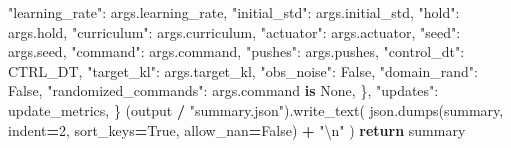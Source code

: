 \documentclass[
  american,
  11pt,
  letterpaper,
]{article}
\newenvironment{Shaded}{\begin{snugshade}}{\end{snugshade}}
\newcommand{\CharTok}[1]{\textcolor[rgb]{0.31,0.60,0.02}{#1}}
\newcommand{\ControlFlowTok}[1]{\textcolor[rgb]{0.13,0.29,0.53}{\textbf{#1}}}
\newcommand{\DecValTok}[1]{\textcolor[rgb]{0.00,0.00,0.81}{#1}}
\newcommand{\KeywordTok}[1]{\textcolor[rgb]{0.13,0.29,0.53}{\textbf{#1}}}
\newcommand{\NormalTok}[1]{#1}
\newcommand{\OperatorTok}[1]{\textcolor[rgb]{0.81,0.36,0.00}{\textbf{#1}}}
\newcommand{\StringTok}[1]{\textcolor[rgb]{0.31,0.60,0.02}{#1}}
\newcommand{\VariableTok}[1]{\textcolor[rgb]{0.00,0.00,0.00}{#1}}
\renewenvironment{Shaded}{\par\smallskip}{\par\smallskip}
\begin{document}
\begin{Shaded}
\begin{Highlighting}[]
            \StringTok{"learning\_rate"}\NormalTok{: args.learning\_rate,}
            \StringTok{"initial\_std"}\NormalTok{: args.initial\_std,}
            \StringTok{"hold"}\NormalTok{: args.hold,}
            \StringTok{"curriculum"}\NormalTok{: args.curriculum,}
            \StringTok{"actuator"}\NormalTok{: args.actuator,}
            \StringTok{"seed"}\NormalTok{: args.seed,}
            \StringTok{"command"}\NormalTok{: args.command,}
            \StringTok{"pushes"}\NormalTok{: args.pushes,}
            \StringTok{"control\_dt"}\NormalTok{: CTRL\_DT,}
            \StringTok{"target\_kl"}\NormalTok{: args.target\_kl,}
            \StringTok{"obs\_noise"}\NormalTok{: }\VariableTok{False}\NormalTok{,}
            \StringTok{"domain\_rand"}\NormalTok{: }\VariableTok{False}\NormalTok{,}
            \StringTok{"randomized\_commands"}\NormalTok{: args.command }\KeywordTok{is} \VariableTok{None}\NormalTok{,}
\NormalTok{        \},}
        \StringTok{"updates"}\NormalTok{: update\_metrics,}
\NormalTok{    \}}
\NormalTok{    (output }\OperatorTok{/} \StringTok{"summary.json"}\NormalTok{).write\_text(}
\NormalTok{        json.dumps(summary, indent}\OperatorTok{=}\DecValTok{2}\NormalTok{, sort\_keys}\OperatorTok{=}\VariableTok{True}\NormalTok{, allow\_nan}\OperatorTok{=}\VariableTok{False}\NormalTok{) }\OperatorTok{+} \StringTok{"}\CharTok{\textbackslash{}n}\StringTok{"}
\NormalTok{    )}
    \ControlFlowTok{return}\NormalTok{ summary}



\end{Highlighting}
\end{Shaded}
\end{document}
